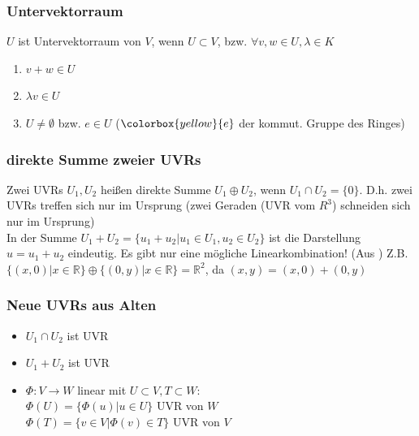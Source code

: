 \documentclass[german, fourcolumn, 8pt]{latex4ei/latex4ei_sheet}
\begin{document}
\begin{sectionbox}
    \subsubsection{Untervektorraum}
    $U$ ist Untervektorraum von $V$, wenn $U \subset V$, bzw. $\forall v,w \in U, \lambda \in K$
    \begin{enumerate}
        \item $v+w \in U$
        \item $\lambda v \in U$
        \item $U \neq \emptyset$ bzw. $e \in U$ ($\colorbox{yellow}{e}$ der kommut. Gruppe des Ringes)
    \end{enumerate}

    \subsubsection{direkte Summe zweier UVRs}
    Zwei UVRs $U_1, U_2$ heißen direkte Summe $U_1 \oplus U_2$, wenn $U_1 \cap U_2= \{0\}$. D.h. zwei UVRs treffen sich nur im Ursprung (zwei Geraden (UVR vom $R^3$) schneiden sich nur im Ursprung)\\
    In der Summe $U_1+U_2=\{u_1 + u_2 \vert u_1 \in U_1, u_2 \in U_2\}$ ist die Darstellung $u=u_1 + u_2$ eindeutig. Es gibt nur eine mögliche Linearkombination! (Aus ) Z.B.\\
    $\{(x, 0) | x \in \mathbb{R}\} \oplus \{(0, y) | x \in \mathbb{R}\} = \mathbb{R}^2$, da $(x,y) = (x,0) + (0,y)$

    \subsubsection{Neue UVRs aus Alten}
    \begin{itemize}
        \item $U_1 \cap U_2$ ist UVR
        \item $U_1 + U_2$ ist UVR
        \item $\Phi : V \rightarrow W$ linear mit $U \subset V, T \subset W$: \\
              $\Phi(U)=\{\Phi(u) | u \in U\}$ UVR von $W$\\
              $\Phi(T)=\{v \in V | \Phi(v) \in T\}$ UVR von $V$
    \end{itemize}
\end{sectionbox}
\end{document}
